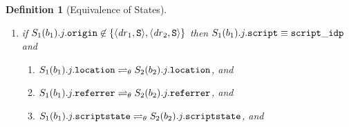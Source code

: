\documentclass[letterpaper,onecolumn,10pt]{article}
\newtheorem{definition}{Definition}
\begin{document}
\begin{definition}[Equivalence of States]
\begin{enumerate}
\begin{enumerate}
\begin{enumerate}
\begin{enumerate}
        \item if $\exists\, l \in L$ such that $l$ is a subterm of
          $S_1(b_1).j.\str{scriptinputs}$, then
          $S_1(b_1).j.\str{location}.\str{host} \equiv \mi{dr}_1$ and
          $S_2(b_2).j.\str{location}.\str{host} \equiv \mi{dr}_2$, and
        \end{enumerate}
      \item\label{eqs:b:w:att_script} if
        $S_1(b_1).j.\mathtt{origin} \not\in
        \{\langle\mathit{dr}_1,\mathtt{S}\rangle,\langle\mathit{dr}_2,\mathtt{S}\rangle\}$
        then $S_1(b_1).j.\mathtt{script} \equiv \mathtt{script\_idp}$ and \
        \begin{enumerate}
        \item
          $S_1(b_1).j.\mathtt{location} \rightleftharpoons_{\theta}
          S_2(b_2).j.\mathtt{location}$, and
        \item
          $S_1(b_1).j.\mathtt{referrer} \rightleftharpoons_{\theta}
          S_2(b_2).j.\mathtt{referrer}$, and
        \item\label{eqs:b:w:att_script:state}
          $S_1(b_1).j.\mathtt{scriptstate} \rightleftharpoons_{\theta}
          S_2(b_2).j.\mathtt{scriptstate}$, and

\end{enumerate}
\end{enumerate}
\end{enumerate}
\end{enumerate}
\end{definition}
\end{document}
